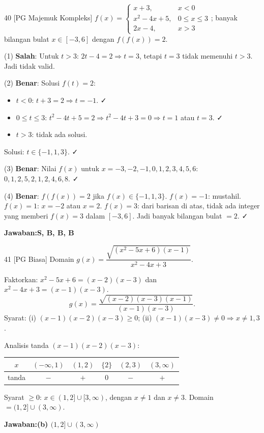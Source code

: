 \documentclass[11pt]{article}
\newcommand{\jawaban}[1]{\textbf{Jawaban:}\enspace\colorbox{gold!30}{\textbf{#1}}}
\begin{document}
\begin{soal}{40 \normalfont\small[PG Majemuk Kompleks]}
$f(x)=\begin{cases}x+3,&x<0\\x^2-4x+5,&0\leq x\leq3\\2x-4,&x>3\end{cases}$; banyak bilangan bulat $x\in[-3,6]$ dengan $f(f(x))=2$.
\end{soal}
\begin{pembox}
(1) \textbf{Salah}: Untuk $t>3$: $2t-4=2\Rightarrow t=3$, tetapi $t=3$ tidak memenuhi $t>3$. Jadi tidak valid.

(2) \textbf{Benar}: Solusi $f(t)=2$:
\begin{itemize}[leftmargin=*,nosep]
  \item $t<0$: $t+3=2\Rightarrow t=-1$. ✓
  \item $0\leq t\leq3$: $t^2-4t+5=2\Rightarrow t^2-4t+3=0\Rightarrow t=1$ atau $t=3$. ✓
  \item $t>3$: tidak ada solusi.
\end{itemize}
Solusi: $t\in\{-1,1,3\}$. ✓

(3) \textbf{Benar}: Nilai $f(x)$ untuk $x=-3,-2,-1,0,1,2,3,4,5,6$:
$0,1,2,5,2,1,2,4,6,8$. ✓

(4) \textbf{Benar}: $f(f(x))=2$ jika $f(x)\in\{-1,1,3\}$.
$f(x)=-1$: mustahil.
$f(x)=1$: $x=-2$ atau $x=2$.
$f(x)=3$: dari barisan di atas, tidak ada integer yang memberi $f(x)=3$ dalam $[-3,6]$.
Jadi banyak bilangan bulat $=2$. ✓

\jawaban{S, B, B, B}
\end{pembox}


\begin{soal}{41 \normalfont\small[PG Biasa]}
Domain $g(x)=\dfrac{\sqrt{(x^2-5x+6)(x-1)}}{x^2-4x+3}$.
\end{soal}
\begin{pembox}
Faktorkan: $x^2-5x+6=(x-2)(x-3)$ dan $x^2-4x+3=(x-1)(x-3)$.
\[
g(x)=\frac{\sqrt{(x-2)(x-3)(x-1)}}{(x-1)(x-3)}.
\]
Syarat: (i) $(x-1)(x-2)(x-3)\geq0$; (ii) $(x-1)(x-3)\neq0\Rightarrow x\neq1,3$.

Analisis tanda $(x-1)(x-2)(x-3)$:
\begin{center}
\begin{tabular}{c|ccccc}
$x$&$(-\infty,1)$&$(1,2)$&$\{2\}$&$(2,3)$&$(3,\infty)$\\\hline
tanda&$-$&$+$&$0$&$-$&$+$
\end{tabular}
\end{center}
Syarat $\geq0$: $x\in(1,2]\cup[3,\infty)$, dengan $x\neq1$ dan $x\neq3$.
Domain $=(1,2]\cup(3,\infty)$.

\jawaban{(b) $(1,2]\cup(3,\infty)$}
\end{pembox}
\end{document}
